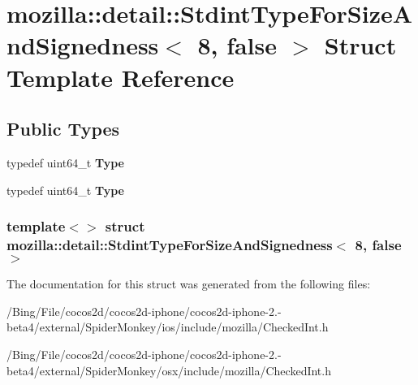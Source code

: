 \hypertarget{structmozilla_1_1detail_1_1_stdint_type_for_size_and_signedness_3_018_00_01false_01_4}{\section{mozilla\-:\-:detail\-:\-:Stdint\-Type\-For\-Size\-And\-Signedness$<$ 8, false $>$ Struct Template Reference}
\label{structmozilla_1_1detail_1_1_stdint_type_for_size_and_signedness_3_018_00_01false_01_4}
}
\subsection*{Public Types}
\begin{DoxyCompactItemize}
\item 
\hypertarget{structmozilla_1_1detail_1_1_stdint_type_for_size_and_signedness_3_018_00_01false_01_4_a9b680daf023323c51c01e616e2110169}{typedef uint64\-\_\-t {\bfseries Type}}\label{structmozilla_1_1detail_1_1_stdint_type_for_size_and_signedness_3_018_00_01false_01_4_a9b680daf023323c51c01e616e2110169}

\item 
\hypertarget{structmozilla_1_1detail_1_1_stdint_type_for_size_and_signedness_3_018_00_01false_01_4_a9b680daf023323c51c01e616e2110169}{typedef uint64\-\_\-t {\bfseries Type}}\label{structmozilla_1_1detail_1_1_stdint_type_for_size_and_signedness_3_018_00_01false_01_4_a9b680daf023323c51c01e616e2110169}

\end{DoxyCompactItemize}
\subsubsection*{template$<$$>$ struct mozilla\-::detail\-::\-Stdint\-Type\-For\-Size\-And\-Signedness$<$ 8, false $>$}



The documentation for this struct was generated from the following files\-:\begin{DoxyCompactItemize}
\item 
/\-Bing/\-File/cocos2d/cocos2d-\/iphone/cocos2d-\/iphone-\/2.-\/beta4/external/\-Spider\-Monkey/ios/include/mozilla/Checked\-Int.\-h\item 
/\-Bing/\-File/cocos2d/cocos2d-\/iphone/cocos2d-\/iphone-\/2.-\/beta4/external/\-Spider\-Monkey/osx/include/mozilla/Checked\-Int.\-h\end{DoxyCompactItemize}
